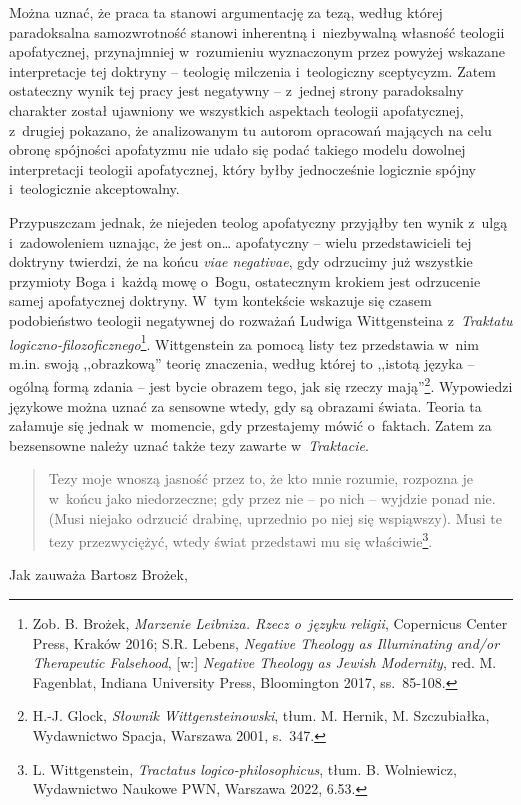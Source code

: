 Można uznać, że praca ta stanowi argumentację za tezą, według której paradoksalna samozwrotność stanowi inherentną i~niezbywalną własność teologii apofatycznej, przynajmniej w~rozumieniu wyznaczonym przez powyżej wskazane interpretacje tej doktryny -- teologię milczenia i~teologiczny sceptycyzm. Zatem ostateczny wynik tej pracy jest negatywny -- z~jednej strony paradoksalny charakter został ujawniony we wszystkich aspektach teologii apofatycznej, z~drugiej pokazano, że analizowanym tu autorom opracowań mających na celu obronę spójności apofatyzmu nie udało się podać takiego modelu dowolnej interpretacji teologii apofatycznej, który byłby jednocześnie logicznie spójny i~teologicznie akceptowalny.

Przypuszczam jednak, że niejeden teolog apofatyczny przyjąłby ten wynik z~ulgą i~zadowoleniem uznając, że jest on… apofatyczny -- wielu przedstawicieli tej doktryny twierdzi, że na końcu \textit{viae negativae}, gdy odrzucimy już wszystkie przymioty Boga i~każdą mowę o~Bogu, ostatecznym krokiem jest odrzucenie samej apofatycznej doktryny.
W~tym kontekście wskazuje się czasem podobieństwo teologii negatywnej do rozważań Ludwiga Wittgensteina z~\textit{Traktatu logiczno-filozoficznego}\footnote{Zob. B. Brożek, \textit{Marzenie Leibniza. Rzecz o~języku religii}, Copernicus Center Press, Kraków 2016; S.R. Lebens, \textit{Negative Theology as Illuminating and/or Therapeutic Falsehood}, [w:] \textit{Negative Theology as Jewish Modernity}, red. M. Fagenblat, Indiana University Press, Bloomington 2017, ss.~85-108.}.
Wittgenstein za pomocą listy tez przedstawia w~nim m.in. swoją ,,obrazkową'' teorię znaczenia, według której to ,,istotą języka -- ogólną formą zdania -- jest bycie obrazem tego, jak się rzeczy mają''\footnote{H.-J. Glock, \textit{Słownik Wittgensteinowski}, tłum. M. Hernik, M. Szczubiałka, Wydawnictwo Spacja, Warszawa 2001, s.~347.}. Wypowiedzi językowe można uznać za sensowne wtedy, gdy są obrazami świata. Teoria ta załamuje się jednak w~momencie, gdy przestajemy mówić o~faktach. Zatem za bezsensowne należy uznać także tezy zawarte w~\textit{Traktacie}.

\begin{quote}
Tezy moje wnoszą jasność przez to, że kto mnie rozumie, rozpozna je w~końcu jako niedorzeczne; gdy przez nie -- po nich -- wyjdzie ponad nie. (Musi niejako odrzucić drabinę, uprzednio po niej się wspiąwszy). Musi te tezy przezwyciężyć, wtedy świat przedstawi mu się właściwie\footnote{L. Wittgenstein, \textit{Tractatus logico-philosophicus}, tłum. B. Wolniewicz, Wydawnictwo Naukowe PWN, Warszawa 2022, 6.53.}.
\end{quote}
Jak zauważa Bartosz Brożek,

